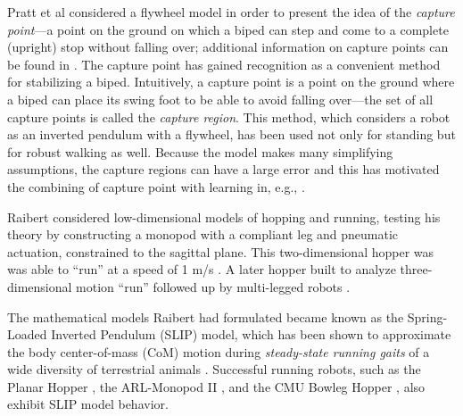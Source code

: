 
%
Pratt et al \cite{Pratt2006} considered a flywheel model in order to present the
idea of the {\em capture point}---a point on the ground on which a biped can
step and come to a complete (upright) stop without falling over;
%
additional information on capture points can be found in \cite{Koolen2012,
  Pratt2012}.
%
The capture point \cite{Pratt2006a} has gained recognition as a convenient
method for stabilizing a biped.
%
Intuitively, a capture point is a point on the ground where a biped can place
its swing foot to be able to avoid falling over---the set of all capture points
is called the {\em capture region}.
%
This method, which considers a robot as an inverted pendulum with a flywheel,
has been used not only for standing but for robust walking as well.
%
Because the model makes many simplifying assumptions, the capture regions can
have a large error and this has motivated the combining of capture point with
learning in, e.g., \cite{Rebula2007}.


Raibert considered low-dimensional models of hopping and running, testing his
theory by constructing a monopod with a compliant leg and pneumatic actuation,
constrained to the sagittal plane.
%
This two-dimensional hopper was was able to ``run'' at a speed of 1 m/s
\cite{Raibert1984, Raibert1986, Raibert1984a}.
%
A later hopper built to analyze three-dimensional motion ``run''
\cite[Chap.~3]{Raibert1986} followed up by multi-legged robots
\cite{Hodgins1991, Raibert1990, Raibert1986a}.
%

The mathematical models Raibert had formulated became known as the Spring-Loaded
Inverted Pendulum (SLIP) model, which has been shown to approximate the body
center-of-mass (CoM) motion during \textit{steady-state running gaits} of a wide
diversity of terrestrial animals \cite{Blickhan1989, Mcmahon1990, Farley1993,
  Full2000, Dickinson2000, Seyfarth2002}.
%
Successful running robots, such as the Planar Hopper \cite{Raibert1986},
the ARL-Monopod II \cite{Ahmadi2006}, and the CMU Bowleg Hopper
\cite{Zeglin1998}, also exhibit SLIP model behavior.
%

